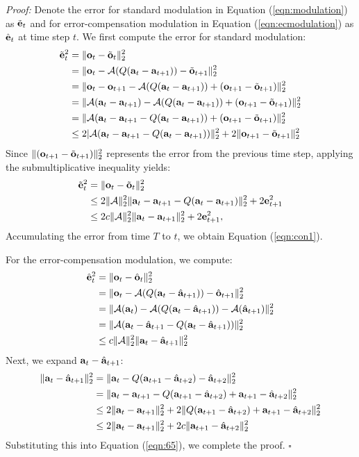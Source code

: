 \textit{Proof:} Denote the error for standard modulation in Equation (\ref{eqn:modulation}) as $\tilde{{\mathbf{e}}}_t$ and for error-compensation modulation in Equation (\ref{eqn:ecmodulation}) as $\hat{{\mathbf{e}}}_t$ at time step $t$. We first compute the error for standard modulation:
\begin{align}
    \tilde{{\mathbf{e}}}_t^2 &= \|{\mathbf{o}}_t-\tilde{{\mathbf{o}}}_t\|_2^2 \\
    &= \|{\mathbf{o}}_t-{\mathcal{A}}(Q({\mathbf{a}}_t-{\mathbf{a}}_{t+1}))-\tilde{{\mathbf{o}}}_{t+1}\|_2^2 \\
    &= \|{\mathbf{o}}_t-{\mathbf{o}}_{t+1}-{\mathcal{A}}(Q({\mathbf{a}}_t-{\mathbf{a}}_{t+1}))+({\mathbf{o}}_{t+1}-\tilde{{\mathbf{o}}}_{t+1})\|_2^2 \\
    &= \|{\mathcal{A}}({\mathbf{a}}_t-{\mathbf{a}}_{t+1})-{\mathcal{A}}(Q({\mathbf{a}}_t-{\mathbf{a}}_{t+1}))+({\mathbf{o}}_{t+1}-\tilde{{\mathbf{o}}}_{t+1})\|_2^2 \\
    &= \|{\mathcal{A}}({\mathbf{a}}_t-{\mathbf{a}}_{t+1}-Q({\mathbf{a}}_t-{\mathbf{a}}_{t+1}))+({\mathbf{o}}_{t+1}-\tilde{{\mathbf{o}}}_{t+1})\|_2^2 \\
    &\leq 2|{\mathcal{A}}({\mathbf{a}}_t-{\mathbf{a}}_{t+1}-Q({\mathbf{a}}_t-{\mathbf{a}}_{t+1}))\|_2^2 + 2\|{\mathbf{o}}_{t+1}-\tilde{{\mathbf{o}}}_{t+1}\|_2^2 
\end{align}
Since $\|({\mathbf{o}}_{t+1}-\tilde{{\mathbf{o}}}_{t+1})\|_2^2$ represents the error from the previous time step, applying the submultiplicative inequality yields:
\begin{align}
    \tilde{{\mathbf{e}}}_t^2 &= \|{\mathbf{o}}_t-\tilde{{\mathbf{o}}}_t\|_2^2 \\
    & \leq 2\|{\mathcal{A}}\|_2^2\|{\mathbf{a}}_t-{\mathbf{a}}_{t+1}-Q({\mathbf{a}}_t-{\mathbf{a}}_{t+1})\|_2^2 + 2{\mathbf{e}}_{t+1}^2 \\
    & \leq 2c\|{\mathcal{A}}\|_2^2\|{\mathbf{a}}_t-{\mathbf{a}}_{t+1}\|_2^2 + 2{\mathbf{e}}_{t+1}^2, 
\end{align}
Accumulating the error from time $T$ to $t$, we obtain Equation (\ref{eqn:con1}).

For the error-compensation modulation, we compute:
\begin{align}
    \hat{{\mathbf{e}}}_t^2 &= \|{\mathbf{o}}_t-\hat{{\mathbf{o}}}_t\|_2^2 \\
    &= \|{\mathbf{o}}_t-{\mathcal{A}}(Q({\mathbf{a}}_t-\hat{{\mathbf{a}}}_{t+1}))-\hat{{\mathbf{o}}}_{t+1}\|_2^2 \\
    & = \|{\mathcal{A}}({\mathbf{a}}_t)-{\mathcal{A}}(Q({\mathbf{a}}_t-\hat{{\mathbf{a}}}_{t+1}))-{\mathcal{A}}(\hat{{\mathbf{a}}}_{t+1})\|_2^2 \\
    & =\|{\mathcal{A}}({\mathbf{a}}_t-\hat{{\mathbf{a}}}_{t+1}-Q({\mathbf{a}}_t-\hat{{\mathbf{a}}}_{t+1}))\|_2^2 \\
    \label{eqn:65}
    &\leq c\|{\mathcal{A}}\|_2^2\|{\mathbf{a}}_t-\hat{{\mathbf{a}}}_{t+1}\|_2^2
\end{align}
Next, we expand ${\mathbf{a}}_t-\hat{{\mathbf{a}}}_{t+1}$:
\begin{align}
    \|{\mathbf{a}}_t-\hat{{\mathbf{a}}}_{t+1}\|_2^2 &= \|{\mathbf{a}}_t-Q({\mathbf{a}}_{t+1}-\hat{{\mathbf{a}}}_{t+2})-\hat{{\mathbf{a}}}_{t+2}\|_2^2 \\
    & = \|{\mathbf{a}}_t-{\mathbf{a}}_{t+1}-Q({\mathbf{a}}_{t+1}-\hat{{\mathbf{a}}}_{t+2})+{\mathbf{a}}_{t+1}-\hat{{\mathbf{a}}}_{t+2}\|_2^2 \\
    & \leq 2\|{\mathbf{a}}_t-{\mathbf{a}}_{t+1}\|_2^2+2\|Q({\mathbf{a}}_{t+1}-\hat{{\mathbf{a}}}_{t+2})+{\mathbf{a}}_{t+1}-\hat{{\mathbf{a}}}_{t+2}\|_2^2 \\
    & \leq 2\|{\mathbf{a}}_t-{\mathbf{a}}_{t+1}\|_2^2+2c\|{\mathbf{a}}_{t+1}-\hat{{\mathbf{a}}}_{t+2}\|_2^2
\end{align}
Substituting this into Equation (\ref{eqn:65}), we complete the proof. 
\hfill$\square$

